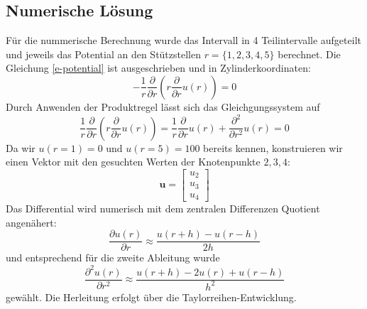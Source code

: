 	\subsection{Numerische Lösung}
	Für die nummerische Berechnung wurde das Intervall in 4 Teilintervalle aufgeteilt und jeweils das Potential an den Stützstellen $r=\{1,2,3,4,5\}$ berechnet.	Die Gleichung \ref{e-potential} ist ausgeschrieben und in Zylinderkoordinaten:
	\begin{equation}
	-\frac{1}{r} \frac{\partial}{\partial r} ( r \frac{\partial }{\partial r} u(r)) = 0
	\end{equation}
	Durch Anwenden der Produktregel lässt sich das Gleichgungssystem auf 
	\begin{equation}
	\frac{1}{r} \frac{\partial}{\partial r} ( r \frac{\partial }{\partial r} u(r)) = \frac{1}{r} \frac{\partial }{\partial r} u(r) +  \frac{\partial^2}{\partial r^2} u(r) = 0
	\end{equation}
	Da wir $u(r=1)=0$ und $u(r=5)=100$ bereits kennen, konstruieren wir einen Vektor mit den gesuchten Werten der Knotenpunkte $2,3,4$:
	\begin{equation}
	\mathbf{u} =	\begin{bmatrix}
	u_2\\
	u_3\\
	u_4
	\end{bmatrix}
	\end{equation}
	Das Differential wird numerisch mit dem zentralen Differenzen Quotient angenähert:
	\begin{equation}
	\frac{\partial u(r)}{\partial r} \approx \frac{u(r+h)-u(r-h)}{2 h}
	\end{equation}
	und entsprechend für die zweite Ableitung wurde
	\begin{equation}
		\frac{\partial^2 u(r)}{\partial r^2} \approx \frac{u(r+h)-2u(r)+u(r-h)}{h^2}
	\end{equation}
	gewählt. Die Herleitung erfolgt über die Taylorreihen-Entwicklung.
	
